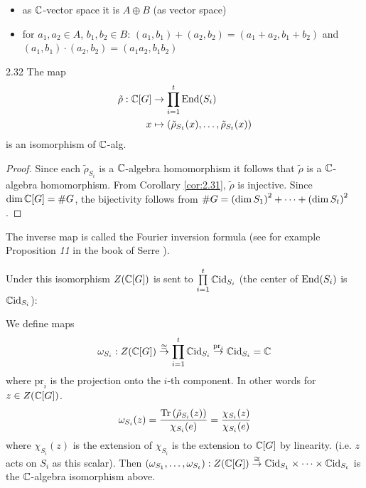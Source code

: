 \documentclass[twoside = false,	%
		headsepline,		%
		parskip = true,
		]{scrbook}						%
\begin{document}
    \begin{itemize}
        \item as $\mathbb C$-vector space it is $A \oplus B$ (as vector space)
        \item for $a_1,a_2 \in A$, $b_1,b_2 \in B$:
            $(a_1,b_1) + (a_2,b_2) = (a_1 + a_2, b_1 + b_2)$ and $(a_1,b_1) \cdot (a_2,b_2) = (a_1a_2, b_1 b_2)$
    \end{itemize}
    \begin{corollary}{}{2.32}
        The map
        \begin{equation*}
        \begin{split}
            \tilde \rho: \mathbb C[G] &\to \prod_{i=1}^t \mathrm{End}(S_i) \\
                            x &\mapsto \left( \tilde{\rho}_{S_1}(x),\dots,\tilde{\rho}_{S_t}(x)\right)
        \end{split}
        \end{equation*}
        is an isomorphism of $\mathbb C$-alg.
    \end{corollary}
    \begin{proof}
        Since each $\tilde \rho_{S_i}$ is a $\mathbb C$-algebra homomorphism it follows that $\tilde{\rho}$ is a $\mathbb C$-algebra homomorphism. From Corollary \ref{cor:2.31}, $\tilde{\rho}$ is injective. Since $\dim \mathbb C[G] = \# G$, the bijectivity follows from $\#G = \left( \dim S_1\right)^2 + \dots + \left( \dim S_t\right)^2$.
    \end{proof}
    The inverse map is called the Fourier inversion formula (see for example Proposition \textit{11} in the book of Serre \cite{Serre.1977}).

    Under this isomorphism $Z(\mathbb C[G])$ is sent to $\prod\limits_{i=1}^t \mathbb C \mathrm{id}_{S_i}$ (the center of $\mathrm{End}(S_i)$ is $\mathbb C \mathrm{id}_{S_i}$):

    We define maps
    \begin{equation*}
        \omega_{S_i}: Z(\mathbb C[G]) \overset{\cong}{\to} \prod\limits_{i=1}^t \mathbb C \mathrm{id}_{S_i} \overset{\mathrm{pr}_i}{\to} \mathbb C \mathrm{id}_{S_i} = \mathbb C 
    \end{equation*}
    where $\mathrm{pr}_i$ is the projection onto the $i$-th component. In other words for $z \in Z(\mathbb C[G])$.
    \begin{equation*}
        \omega_{S_i}(z) = \frac{\mathrm{Tr}\left( \tilde \rho_{S_i}(z)\right)}{\chi_{S_i}(e)} = \frac{\chi_{S_i}(z)}{\chi_{S_i}(e)}
    \end{equation*}
    where $\chi_{S_i}(z)$ is the extension of $\chi_{S_i}$ is the extension to $\mathbb C[G]$ by linearity.
    (i.e. $z$ acts on $S_i$ as this scalar). Then $(\omega_{S_1},\dots ,\omega_{S_t}): Z(\mathbb C[G]) \overset{\cong}{\to} \mathbb C \mathrm{id}_{S_1} \times\dots \times \mathbb C \mathrm{id}_{S_t}$ is the $\mathbb C$-algebra isomorphism above.
    
\end{document}
